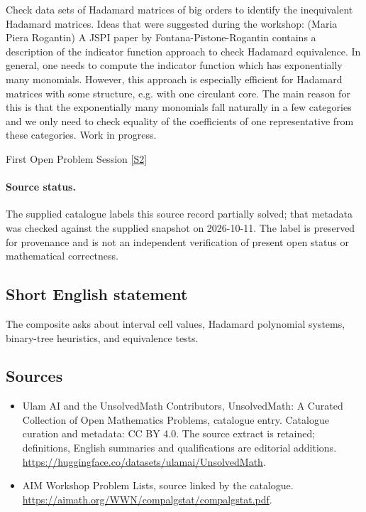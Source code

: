 \documentclass[11pt]{article}
\newcommand{\sref}[2]{\hyperlink{source:#1:#2}{[S#2]}}
\begin{document}
Check data sets of Hadamard matrices of big orders to identify the inequivalent Hadamard matrices. Ideas that were suggested during the workshop: (Maria Piera Rogantin) A JSPI paper by Fontana-Pistone-Rogantin contains a description of the indicator function approach to check Hadamard equivalence. In general, one needs to compute the indicator function which has exponentially many monomials. However, this approach is especially efficient for Hadamard matrices with some structure, e.g. with one circulant core. The main reason for this is that the exponentially many monomials fall naturally in a few categories and we only need to check equality of the coefficients of one representative from these categories. Work in progress.

First Open Problem Session \sref{statement}{2}
\paragraph{Source status.}
The supplied catalogue labels this source record partially solved; that metadata was checked against the supplied snapshot on 2026-10-11. The label is preserved for provenance and is not an independent verification of present open status or mathematical correctness.
\subsection{Short English statement}
The composite asks about interval cell values, Hadamard polynomial systems, binary-tree heuristics, and equivalence tests.
\subsection{Sources}
\begin{itemize}
\item[\hypertarget{source:statement:1}{S1}] Ulam AI and the UnsolvedMath Contributors, UnsolvedMath: A Curated Collection of Open Mathematics Problems, catalogue entry. Catalogue curation and metadata: CC BY 4.0. The source extract is retained; definitions, English summaries and qualifications are editorial additions.
\url{https://huggingface.co/datasets/ulamai/UnsolvedMath}.
\item[\hypertarget{source:statement:2}{S2}] AIM Workshop Problem Lists, source linked by the catalogue.
\url{https://aimath.org/WWN/compalgstat/compalgstat.pdf}.
\end{itemize}
\end{document}
